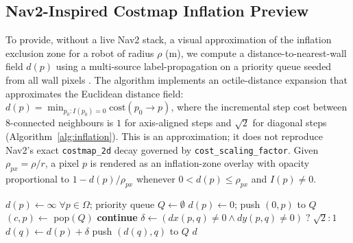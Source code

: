 \documentclass{IEEE_lsens}
\begin{document}
\subsection{Nav2-Inspired Costmap Inflation Preview}
To provide, without a live Nav2 stack, a visual approximation of the inflation exclusion zone for a robot of radius $\rho$ (m), we compute a distance-to-nearest-wall field $d(p)$ using a multi-source label-propagation on a priority queue seeded from all wall pixels \cite{borgefors1986distance}. The algorithm implements an octile-distance expansion that approximates the Euclidean distance field: $d(p) = \min_{p_0 : I(p_0)=0} \mathrm{cost}(p_0 \rightarrow p)$, where the incremental step cost between 8-connected neighbours is $1$ for axis-aligned steps and $\sqrt{2}$ for diagonal steps (Algorithm~\ref{alg:inflation}). This is an approximation; it does not reproduce Nav2's exact \texttt{costmap\_2d} decay governed by \texttt{cost\_scaling\_factor}. Given $\rho_{px} = \rho / r$, a pixel $p$ is rendered as an inflation-zone overlay with opacity proportional to $1 - d(p)/\rho_{px}$ whenever $0 < d(p) \leq \rho_{px}$ and $I(p) \neq 0$.

\begin{algorithm}[t]
\small
\caption{Multi-source octile distance transform for inflation}
\label{alg:inflation}
\begin{algorithmic}[1]
\State $d(p) \gets \infty \; \forall p \in \Omega$; priority queue $Q \gets \emptyset$ 
 \State $d(p)\gets 0$; push $(0, p)$ to $Q$ \EndFor
{}
  \State $(c, p) \gets $ pop$(Q)$ 
   \textbf{continue} \EndIf {}
     \State $\delta \gets (dx(p,q)\neq 0 \wedge dy(p,q) \neq 0) \; ? \; \sqrt{2} : 1$
        \State $d(q) \gets d(p) + \delta$
         push $(d(q), q)$ to $Q$ \EndIf
     \EndIf
  \EndFor
\EndWhile
\State \Return $d$
\end{algorithmic}
\end{algorithm}
\vspace{-2mm}
\end{document}
